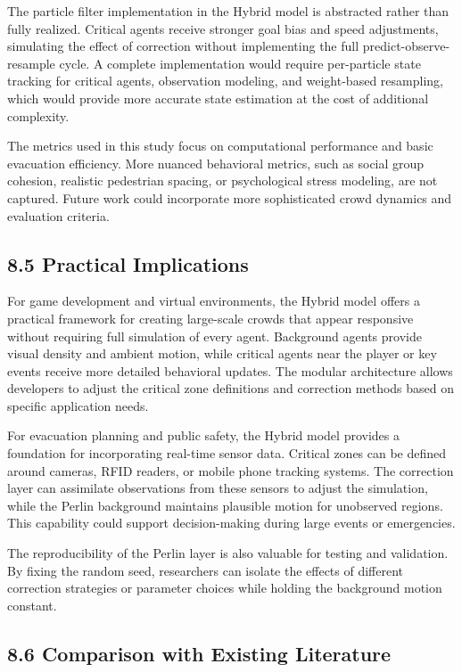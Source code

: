 \documentclass[
  11pt,
]{article}
\begin{document}
The particle filter implementation in the Hybrid model is abstracted
rather than fully realized. Critical agents receive stronger goal bias
and speed adjustments, simulating the effect of correction without
implementing the full predict-observe-resample cycle. A complete
implementation would require per-particle state tracking for critical
agents, observation modeling, and weight-based resampling, which would
provide more accurate state estimation at the cost of additional
complexity.

The metrics used in this study focus on computational performance and
basic evacuation efficiency. More nuanced behavioral metrics, such as
social group cohesion, realistic pedestrian spacing, or psychological
stress modeling, are not captured. Future work could incorporate more
sophisticated crowd dynamics and evaluation criteria.

\subsection{8.5 Practical Implications}\label{practical-implications}

For game development and virtual environments, the Hybrid model offers a
practical framework for creating large-scale crowds that appear
responsive without requiring full simulation of every agent. Background
agents provide visual density and ambient motion, while critical agents
near the player or key events receive more detailed behavioral updates.
The modular architecture allows developers to adjust the critical zone
definitions and correction methods based on specific application needs.

For evacuation planning and public safety, the Hybrid model provides a
foundation for incorporating real-time sensor data. Critical zones can
be defined around cameras, RFID readers, or mobile phone tracking
systems. The correction layer can assimilate observations from these
sensors to adjust the simulation, while the Perlin background maintains
plausible motion for unobserved regions. This capability could support
decision-making during large events or emergencies.

The reproducibility of the Perlin layer is also valuable for testing and
validation. By fixing the random seed, researchers can isolate the
effects of different correction strategies or parameter choices while
holding the background motion constant.

\subsection{8.6 Comparison with Existing
Literature}\label{comparison-with-existing-literature}
\end{document}
